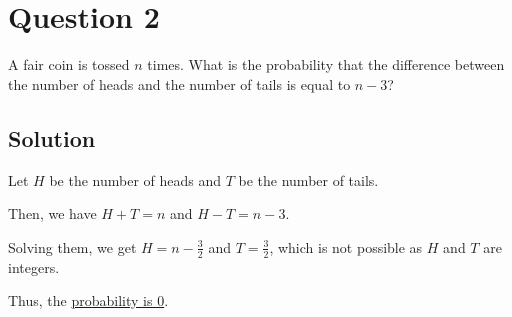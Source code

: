\section*{Question 2}

A fair coin is tossed \(n\) times.
What is the probability that the difference between the number of heads and the number of tails is equal to \(n - 3\)?

\subsection*{Solution}

Let \(H\) be the number of heads and \(T\) be the number of tails.

Then, we have \(H + T = n\) and \(H - T = n - 3\).

Solving them, we get \(H = n - \frac{3}{2}\) and \(T = \frac{3}{2}\), which is not possible as \(H\) and \(T\) are integers.

Thus, the \underline{probability is 0}.
